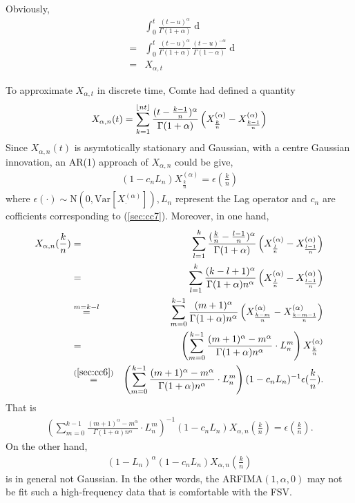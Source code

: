 \documentclass[a4paper, twoside, 11pt]{article}
\theoremstyle{definition}
\DeclarePairedDelimiter\floor{\lfloor}{\rfloor}
\newcommand{\brkt}[1]{\left({#1} \right)}
\begin{document}
Obviously,
\begin{eqnarray}
  &&\int_0^t \frac{(t-u)^\alpha}{\Gamma(1+\alpha)} \mathop{dX^{(\alpha)}_u}\nonumber\\
  &=& \int_0^t \frac{(t-u)^\alpha}{\Gamma(1+\alpha)} \frac{(t-u)^{-\alpha}}{\Gamma(1-\alpha)} \mathop{dX_{\alpha,u}}\nonumber\\
  &=& X_{\alpha,t}
  \label{sec:cc5}
\end{eqnarray}

To approximate $ X_{\alpha,t}$ in discrete time, Comte had defined a quantity
\begin{eqnarray}
  X_{\alpha,n}(t) = \sum_{k=1}^{\floor{nt}} \frac{(t - \frac{k-1}{n})^\alpha}{\Gamma(1+\alpha)} \brkt{X^{(\alpha)}_{\frac{k}{n}} - X^{(\alpha)}_{\frac{k-1}{n}}}
  \label{sec:cc7}
\end{eqnarray}
Since $X_{\alpha, n}(t)$ is asymtotically stationary and Gaussian, with a centre Gaussian innovation, an AR(1) approach of $X_{\alpha, n}$ could be give,
\begin{eqnarray}
  (1-c_nL_n) X^{(\alpha)}_{\frac{k}{n}} = \epsilon(\frac{k}{n})
  \label{sec:cc6}
\end{eqnarray}
where $\epsilon(\cdot) \sim \mathrm{N}(0, \mathrm{Var}[X^{(\alpha)}_{\cdot}]), L_n$ represent the Lag operator and $c_n$ are cofficients corresponding to (\ref{sec:cc7}). Moreover, in one hand,
\begin{eqnarray}
  X_{\alpha,n}(\frac{k}{n}) &=& \sum_{l=1}^{k} \frac{(\frac{k}{n} - \frac{l-1}{n})^\alpha}{\Gamma(1+\alpha)} \brkt{X^{(\alpha)}_{\frac{l}{n}} - X^{(\alpha)}_{\frac{l-1}{n}}}\nonumber\\
  &=& \sum_{l=1}^{k} \frac{(k - l + 1)^\alpha}{\Gamma(1+\alpha)n^\alpha} \brkt{X^{(\alpha)}_{\frac{l}{n}} - X^{(\alpha)}_{\frac{l-1}{n}}}\nonumber\\
  &\overset{m=k-l}{=}& \sum_{m=0}^{k-1} \frac{(m + 1)^\alpha}{\Gamma(1+\alpha)n^\alpha} \brkt{X^{(\alpha)}_{\frac{k-m}{n}} - X^{(\alpha)}_{\frac{k-m-1}{n}}}\nonumber\\ 
  &=& \brkt{\sum_{m=0}^{k-1} \frac{(m + 1)^\alpha - m^\alpha}{\Gamma(1+\alpha)n^\alpha} \cdot L_n^m} X^{(\alpha)}_{\frac{k}{n}} \nonumber\\
  &\overset{(\ref{sec:cc6})}{=}&  \brkt{\sum_{m=0}^{k-1} \frac{(m + 1)^\alpha - m^\alpha}{\Gamma(1+\alpha)n^\alpha} \cdot L_n^m} (1-c_nL_n)^{-1}\epsilon(\frac{k}{n}).
\end{eqnarray}
That is
\begin{eqnarray*}
  \brkt{\sum_{m=0}^{k-1} \frac{(m + 1)^\alpha - m^\alpha}{\Gamma(1+\alpha)n^\alpha} \cdot L_n^m}^{-1} (1-c_nL_n) X_{\alpha,n}(\frac{k}{n}) =\epsilon(\frac{k}{n}).
\end{eqnarray*}
On the other hand, 
\begin{eqnarray*}
  (1-L_n)^\alpha(1-c_nL_n)X_{\alpha,n}(\frac{k}{n})
\end{eqnarray*}
is in general not Gaussian. In the other words, the ARFIMA$(1, \alpha, 0)$ may not be fit such a high-frequency data that is comfortable with the FSV. 
\end{document}
